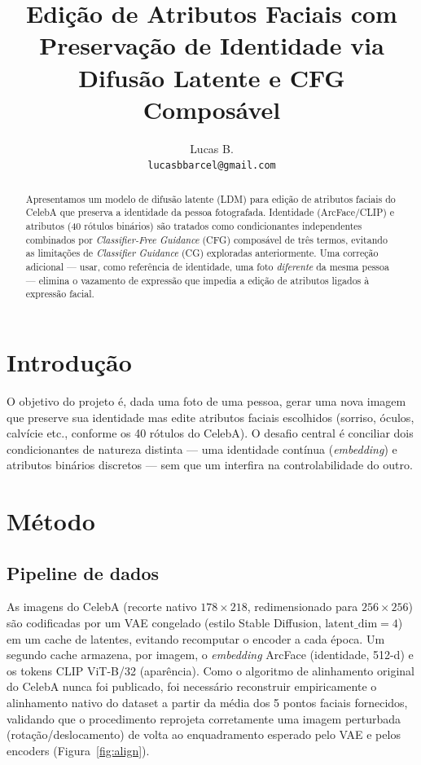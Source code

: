 \documentclass[9pt,twocolumn]{extarticle}
\title{\vspace{-1.2em}\textbf{\large Edição de Atributos Faciais com Preservação de Identidade via Difusão Latente e CFG Composável}\vspace{-0.8em}}
\author{\footnotesize Lucas B. \\[-0.3em] \footnotesize \texttt{lucasbbarcel@gmail.com}}
\date{}
\begin{document}
\maketitle
\vspace{-2.2em}

\begin{abstract}
\footnotesize
Apresentamos um modelo de difusão latente (LDM) para edição de atributos faciais do CelebA que preserva a identidade da pessoa fotografada. Identidade (ArcFace/CLIP) e atributos (40 rótulos binários) são tratados como condicionantes independentes combinados por \emph{Classifier-Free Guidance} (CFG) composável de três termos, evitando as limitações de \emph{Classifier Guidance} (CG) exploradas anteriormente. Uma correção adicional --- usar, como referência de identidade, uma foto \emph{diferente} da mesma pessoa --- elimina o vazamento de expressão que impedia a edição de atributos ligados à expressão facial.
\end{abstract}

\section{Introdução}
O objetivo do projeto é, dada uma foto de uma pessoa, gerar uma nova imagem que preserve sua identidade mas edite atributos faciais escolhidos (sorriso, óculos, calvície etc., conforme os 40 rótulos do CelebA). O desafio central é conciliar dois condicionantes de natureza distinta --- uma identidade contínua (\emph{embedding}) e atributos binários discretos --- sem que um interfira na controlabilidade do outro.

\section{Método}

\subsection{Pipeline de dados}
As imagens do CelebA (recorte nativo $178\times218$, redimensionado para $256\times256$) são codificadas por um VAE congelado (estilo Stable Diffusion, $\mathrm{latent\_dim}=4$) em um cache de latentes, evitando recomputar o encoder a cada época. Um segundo cache armazena, por imagem, o \emph{embedding} ArcFace (identidade, 512-d) e os tokens CLIP ViT-B/32 (aparência). Como o algoritmo de alinhamento original do CelebA nunca foi publicado, foi necessário reconstruir empiricamente o alinhamento nativo do dataset a partir da média dos 5 pontos faciais fornecidos, validando que o procedimento reprojeta corretamente uma imagem perturbada (rotação/deslocamento) de volta ao enquadramento esperado pelo VAE e pelos encoders (Figura~\ref{fig:align}).
\end{document}
